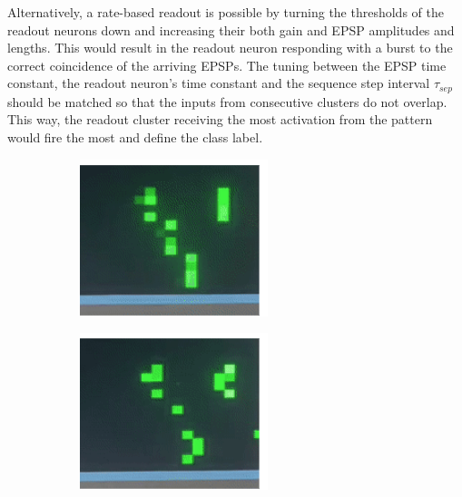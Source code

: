 Alternatively, a rate-based readout is possible by turning the thresholds of the readout neurons down and increasing their both gain and EPSP amplitudes and lengths. This would result in the readout neuron responding with a burst to the correct coincidence of the arriving EPSPs. The tuning between the EPSP time constant, the readout neuron's time constant and the sequence step interval $\tau_{sep}$ should be matched so that the inputs from consecutive clusters do not overlap. This way, the readout cluster receiving the most activation from the pattern would fire the most and define the class label.\\

\begin{figure}[h!]
  \centering
  \begin{subfigure}{0.22\textwidth}
    \includegraphics[width=\linewidth]{img/chapter5/pattern_3213.png}
    \caption{}
  \end{subfigure}
  \begin{subfigure}{0.22\textwidth}
    \includegraphics[width=\linewidth]{img/chapter5/pattern_3213_2.png}

\end{subfigure}
\end{figure}
